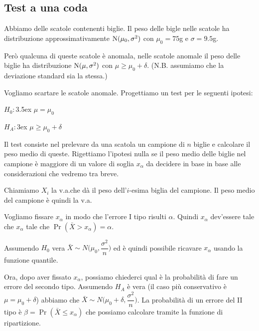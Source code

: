 \documentclass[11pt,openany]{book}
\begin{document}
\subsection{Test a una coda}
Abbiamo delle scatole contenenti biglie.
Il peso delle bigle nelle scatole ha distribuzione approssimativamente  ${\rm N}(\mu_0,\sigma^2)$ con $\mu_0=75$g e $\sigma=9.5$g. 

Però qualcuna di queste scatole è anomala, nelle scatole anomale il peso delle biglie ha distribuzione ${\rm N}(\mu,\sigma^2)$ con $\mu\ge\mu_0+\delta$. (N.B. assumiamo che la deviazione standard sia la stessa.)

Vogliamo scartare le scatole anomale. 
Progettiamo un test per le seguenti ipotesi:

$H_0:$\kern3.5ex $\mu=\mu_0$

$H_A:$\kern3ex $\mu\ge\mu_0+\delta$

Il test consiste nel prelevare da una scatola un campione di $n$ biglie e calcolare il peso medio di queste. 
Rigettiamo l'ipotesi nulla se il peso medio delle biglie nel campione è maggiore di un valore di soglia $x_\alpha$ da decidere in base in base alle considerazioni che vedremo tra breve.

Chiamiamo $X_i$ la v.a.\@ che dà il peso dell'$i$-esima biglia del campione.
Il peso medio del campione è quindi la v.a.\@



Vogliamo fissare $x_\alpha$ in modo che l'errore I tipo risulti $\alpha$. 
Quindi $x_\alpha$ dev'essere tale che $x_\alpha$ tale che $\Pr(\bar X>x_\alpha)=\alpha$.

Assumendo $H_0$ vera $\bar X\sim N\bigg(\mu_0,\dfrac{\sigma^2}{n}\bigg)$ ed è quindi possibile ricavare $x_\alpha$ usando la funzione quantile.


Ora, dopo aver fissato $x_\alpha$, possiamo chiederci qual è la probabilità di fare un errore del secondo tipo.
Assumendo $H_A$ è vera (il caso più conservativo è $\mu=\mu_0+\delta$) abbiamo che $\bar X\sim N\bigg(\mu_0+\delta,\dfrac{\sigma^2}{n}\bigg)$. 
La probabilità di un errore del II tipo è $\beta=\Pr(\bar X\le x_\alpha)$ che possiamo calcolare tramite la funzione di ripartizione.

% 
\end{document}
